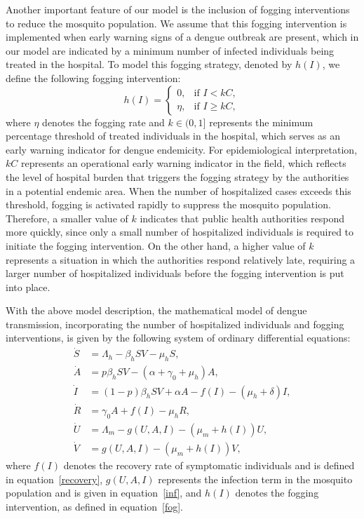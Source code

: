 \documentclass[preprint]{elsarticle}
\begin{document}
Another important feature of our model is the inclusion of fogging interventions to reduce the mosquito population. We assume that this fogging intervention is implemented when early warning signs of a dengue outbreak are present, which in our model are indicated by a minimum number of infected individuals being treated in the hospital. To model this fogging strategy, denoted by $h(I)$, we define the following fogging intervention:
\begin{equation}\label{fog}
    h(I) =
    \begin{cases}
     0, & \text{if } I < kC, \\
     \eta, & \text{if } I \geq  kC,
    \end{cases}
\end{equation}
where $\eta$ denotes the fogging rate and $k \in (0,1]$ represents the minimum percentage threshold of treated individuals in the hospital, which serves as an early warning indicator for dengue endemicity. For epidemiological interpretation, $kC$ represents an operational early warning indicator in the field, which reflects the level of hospital burden that triggers the fogging strategy by the authorities in a potential endemic area. When the number of hospitalized cases exceeds this threshold, fogging is activated rapidly to suppress the mosquito population. Therefore, a smaller value of $k$ indicates that public health authorities respond more quickly, since only a small number of hospitalized individuals is required to initiate the fogging intervention. On the other hand, a higher value of $k$ represents a situation in which the authorities respond relatively late, requiring a larger number of hospitalized individuals before the fogging intervention is put into place.

With the above model description, the mathematical model of dengue transmission, incorporating the number of hospitalized individuals and fogging interventions, is given by the following system of ordinary differential equations:
\begin{equation}\label{model}
    \begin{aligned}
        \dot{S} &= \Lambda_h - \beta_h S V - \mu_h S,  \\
    \dot{A} &= p \beta_h S V - \left(\alpha + \gamma_0 + \mu_h\right)A,  \\
    \dot{I} &= (1-p)\beta_h S V + \alpha A - f(I) - (\mu_h + \delta)I,  \\
    \dot{R} &= \gamma_0 A + f(I) - \mu_h R, \\
    \dot{U} &= \Lambda_m - g(U,A,I) - (\mu_m + h(I))U,  \\
    \dot{V} &= g(U,A,I) - (\mu_m + h(I))V,
    \end{aligned}
\end{equation}
where $f(I)$ denotes the recovery rate of symptomatic individuals and is defined in equation~\eqref{recovery}, $g(U,A,I)$ represents the infection term in the mosquito population and is given in equation~\eqref{inf}, and $h(I)$ denotes the fogging intervention, as defined in equation~\eqref{fog}.
\end{document}
